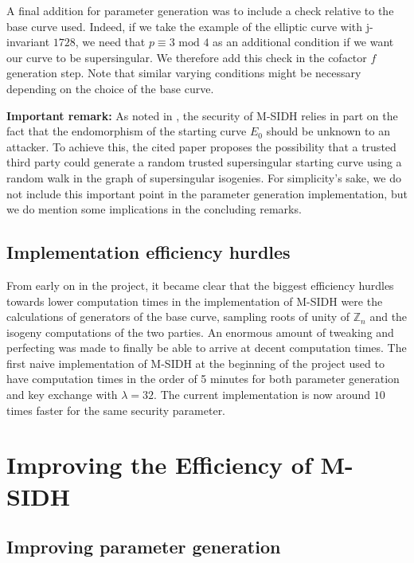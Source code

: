 \documentclass[a4paper,11pt,oneside]{report}
\newcommand{\zn}{$\mathbb{Z}_n$\xspace}
\begin{document}
    A final addition for parameter generation was to include a check relative to the base curve used. Indeed, if we take the example of the elliptic curve with j-invariant $1728$, we need that $p \equiv 3 \textrm{ mod } 4$ as an additional condition if we want our curve to be supersingular. We therefore add this check in the cofactor $f$ generation step. Note that similar varying conditions might be necessary depending on the choice of the base curve.

    \textbf{Important remark:}
    \label{endo_remark}
    As noted in \cite{msidh}, the security of M-SIDH relies in part on the fact that the endomorphism of the starting curve $E_0$ should be unknown to an attacker. To achieve this, the cited paper proposes the possibility that a trusted third party could generate a random trusted supersingular starting curve using a random walk in the graph of supersingular isogenies. For simplicity's sake, we do not include this important point in the parameter generation implementation, but we do mention some implications in the concluding remarks.

    \subsection{Implementation efficiency hurdles}

    From early on in the project, it became clear that the biggest efficiency hurdles towards lower computation times in the implementation of M-SIDH were the calculations of generators of the base curve, sampling roots of unity of \zn and the isogeny computations of the two parties. An enormous amount of tweaking and perfecting was made to finally be able to arrive at decent computation times. The first naive implementation of M-SIDH at the beginning of the project used to have computation times in the order of 5 minutes for both parameter generation and key exchange with $\lambda = 32$. The current implementation is now around $10$ times faster for the same security parameter.

\section{Improving the Efficiency of M-SIDH}

    \subsection{Improving parameter generation}
\end{document}
